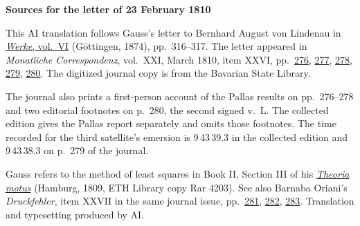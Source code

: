 \clearpage\thispagestyle{empty}
\begin{center}\textbf{Sources for the letter of 23 February 1810}\end{center}
\noindent This AI translation follows Gauss’s letter to Bernhard August von Lindenau in \href{https://gdz.sub.uni-goettingen.de/id/PPN236007467}{\textit{Werke}, vol.~VI} (Göttingen, 1874), pp.~316--317. The letter appeared in \textit{Monatliche Correspondenz}, vol.~XXI, March 1810, item XXVI, pp.~\href{https://api.digitale-sammlungen.de/iiif/image/v2/bsb10538611_00284/full/1600,/0/default.jpg}{276}, \href{https://api.digitale-sammlungen.de/iiif/image/v2/bsb10538611_00285/full/1600,/0/default.jpg}{277}, \href{https://api.digitale-sammlungen.de/iiif/image/v2/bsb10538611_00286/full/1600,/0/default.jpg}{278}, \href{https://api.digitale-sammlungen.de/iiif/image/v2/bsb10538611_00287/full/1600,/0/default.jpg}{279}, \href{https://api.digitale-sammlungen.de/iiif/image/v2/bsb10538611_00288/full/1600,/0/default.jpg}{280}. The digitized journal copy is from the Bavarian State Library.
\par\smallskip\noindent The journal also prints a first-person account of the Pallas results on pp.~276--278 and two editorial footnotes on p.~280, the second signed v.~L. The collected edition gives the Pallas report separately and omits those footnotes. The time recorded for the third satellite’s emersion is 9\,43\,39.3 in the collected edition and 9\,43\,38.3 on p.~279 of the journal.
\par\smallskip\noindent Gauss refers to the method of least squares in Book II, Section III of his \href{https://www.e-rara.ch/zut/doi/10.3931/e-rara-522?lang=en}{\textit{Theoria motus}} (Hamburg, 1809, ETH Library copy Rar 4203). See also Barnaba Oriani’s \textit{Druckfehler}, item XXVII in the same journal issue, pp.~\href{https://api.digitale-sammlungen.de/iiif/image/v2/bsb10538611_00289/full/1600,/0/default.jpg}{281}, \href{https://api.digitale-sammlungen.de/iiif/image/v2/bsb10538611_00290/full/1600,/0/default.jpg}{282}, \href{https://api.digitale-sammlungen.de/iiif/image/v2/bsb10538611_00291/full/1600,/0/default.jpg}{283}. Translation and typesetting produced by AI.
\clearpage
